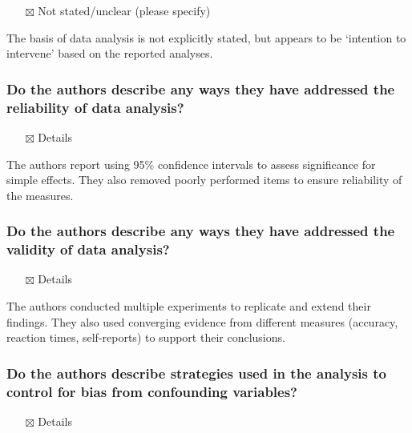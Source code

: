 \documentclass[
  doc, a4paper]{apa7}
\providecommand{\tightlist}{%
  \setlength{\itemsep}{0pt}\setlength{\parskip}{0pt}}
\begin{document}
\begin{itemize}
\tightlist
\item[$\boxtimes$]
  Not stated/unclear (please specify)
\end{itemize}

The basis of data analysis is not explicitly stated, but appears to be `intention to intervene' based on the reported analyses.

\subsubsection{Do the authors describe any ways they have addressed the reliability of data analysis?}\label{do-the-authors-describe-any-ways-they-have-addressed-the-reliability-of-data-analysis}

\begin{itemize}
\tightlist
\item[$\boxtimes$]
  Details
\end{itemize}

The authors report using 95\% confidence intervals to assess significance for simple effects. They also removed poorly performed items to ensure reliability of the measures.

\subsubsection{Do the authors describe any ways they have addressed the validity of data analysis?}\label{do-the-authors-describe-any-ways-they-have-addressed-the-validity-of-data-analysis}

\begin{itemize}
\tightlist
\item[$\boxtimes$]
  Details
\end{itemize}

The authors conducted multiple experiments to replicate and extend their findings. They also used converging evidence from different measures (accuracy, reaction times, self-reports) to support their conclusions.

\subsubsection{Do the authors describe strategies used in the analysis to control for bias from confounding variables?}\label{do-the-authors-describe-strategies-used-in-the-analysis-to-control-for-bias-from-confounding-variables}

\begin{itemize}
\tightlist
\item[$\boxtimes$]
  Details
\end{itemize}
\end{document}
